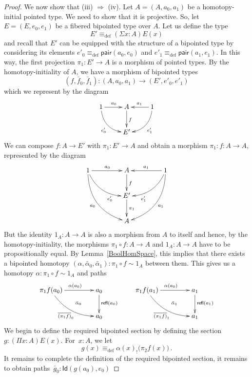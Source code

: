 \documentclass[reqno,10pt,a4paper,oneside]{amsart}
\numberwithin{equation}{section}
\theoremstyle{mythm}
\theoremstyle{mydef}
\theoremstyle{myrmk}
\newcommand{\deq}{\equiv}
\newcommand{\defeq}{\deq_{\mathrm{def}}}
\newcommand{\co}{\colon}
\newcommand{\pair}{\mathsf{pair}}
\newcommand{\Id}{\mathsf{Id}}
\newcommand{\refl}{\mathsf{refl}}
\begin{document}
\begin{proof}
We now  show that (iii) $\Rightarrow$ (iv).
Let $A = (A, a_0, a_1)$ be a homotopy-initial pointed type. We need to show that it is projective. So, let $E = (E, e_0, e_1)$ be a fibered 
bipointed type over $A$. Let us define the type 
\[
E' \defeq (\Sigma x \co A) E(x) 
\]
and recall that $E'$ can be equipped with the structure of a bipointed type by considering its elements $e'_0 \defeq \pair(a_0, e_0)$ and $e'_1 \defeq \pair(a_1, e_1)$. In this way,  the first projection $\pi_1 \co E' \to A$ is a morphism of pointed types. By the homotopy-initiality of $A$, we have a morphism of bipointed types
\[
(f, \bar{f}_0, \bar{f}_1) \co (A, a_0, a_1)  \to (E', e'_0, e'_1) 
\]
which we represent by the diagram
\[
\xymatrix{
1 \ar@/_1pc/[dr]_{e'_0} \ar[r]^{a_0} & A  \ar[d]^f & 1 \ar[l]_{a_1} \ar@/^1pc/[dl]^{e'_1} \\
 & E' & }
 \]
 We can compose $f \co A \to E'$ with $\pi_1 \co E' \to A$ and obtain a morphism $\pi_1 \co f \co A \to A$, represented by the diagram
  \[
\xymatrix@C=1.5cm{
1 \ar@/_1pc/[dr]_(.7){e'_0} \ar[r]^{a_0} \ar@/_1.5pc/[ddr]_{a_0}  & A  \ar[d]^f & 1 \ar[l]_{a_1} \ar@/^1pc/[dl]^(.7){e'_1} \ar@/^1.5pc/[ddl]^{a_1}  \\
 & E' \ar[d]^{\pi_1} & \\
 & A &  }
 \]
But the identity $1_A \co A \to A$ is also a morphism from $A$ to itself and hence, by the homotopy-initiality, the morphisms $\pi_1 \circ f \co A \to A$
and $1_A \co A \to A$ have to be propositionally equal. By Lemma~\ref{BoolHomSpace}, this implies that there exists a bipointed homotopy $(\alpha,
\bar{\alpha}_0,\bar{\alpha}_1) \co \pi_1 \circ f \sim 1_A$ between them. This gives us a homotopy $\alpha \co \pi_1 \circ f \sim 1_A$ and paths
\[
\xymatrix@C=1.5cm{
\pi_1 f (a_0) \ar[r]^{\alpha(a_0)} \ar@/_1pc/[dr]_{\overline{(\pi_1 f)}_0} \ar@{}[dr]|{\quad \bar{\alpha}_0}  & a_0 \ar[d]^{\refl(a_0)} \\
 & a_0 } \qquad
 \xymatrix@C=1.5cm{
\pi_1 f (a_1) \ar[r]^{\alpha(a_0)} \ar@/_1pc/[dr]_{\overline{(\pi_1 f)}_1} \ar@{}[dr]|{\quad \bar{\alpha}_1}  & a_1 \ar[d]^{\refl(a_1)} \\
 & a_1 }
\]
We begin to define the required bipointed section by defining the section $g \co (\Pi x \co A) E(x)$. For~$x \co A$, we let
\begin{equation}
\label{equ:defreqsection}
g(x) \defeq \alpha(x)_{!} \big( \pi_2 f (x) \big) \, .
\end{equation}
It remains to complete the definition of the required bipointed section, it remains to obtain paths~$\bar{g}_0 \co \Id( g(a_0), e_0)$ 

\end{proof}
\end{document}
